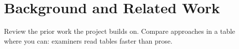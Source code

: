\chapter{Background and Related Work}
Review the prior work the project builds on. Compare approaches in a
table where you can: examiners read tables faster than prose.


